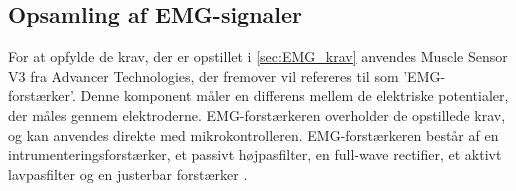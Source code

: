 


\subsection{Opsamling af EMG-signaler} \label{sec:EMG_krav}
For at opfylde de krav, der er opstillet i \autoref{sec:EMG_krav} anvendes Muscle Sensor V3 fra Advancer Technologies, der fremover vil refereres til som 'EMG-forstærker'. Denne komponent måler en differens mellem de elektriske potentialer, der måles gennem elektroderne. EMG-forstærkeren overholder de opstillede krav, og kan anvendes direkte med mikrokontrolleren. EMG-forstærkeren består af en intrumenteringsforstærker, et passivt højpasfilter, en full-wave rectifier, et aktivt lavpasfilter og en justerbar forstærker \citep{advancertech2013}. 

